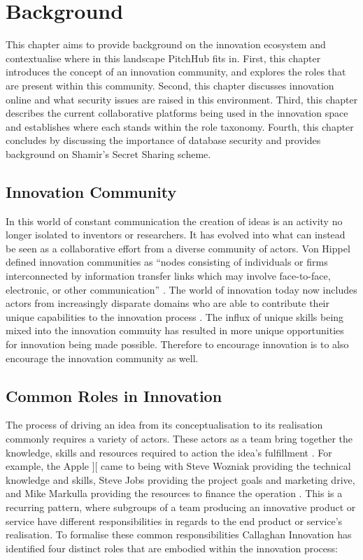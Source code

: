 \chapter{Background}

This chapter aims to provide background on the innovation ecosystem and contextualise where in this landscape PitchHub fits in. First, this chapter introduces the concept of an innovation community, and explores the roles that are present within this community. Second, this chapter discusses innovation online and what security issues are raised in this environment. Third, this chapter describes the current collaborative platforms being used in the innovation space and establishes where each stands within the role taxonomy. Fourth, this chapter concludes by discussing the importance of database security and provides background on Shamir's Secret Sharing scheme.

\section{Innovation Community}
In this world of constant communication the creation of ideas is an activity no longer isolated to inventors or researchers. It has evolved into what can instead be seen as a collaborative effort from a diverse community of actors. Von Hippel defined innovation communities as ``nodes consisting of individuals or firms interconnected by information transfer links which may involve face-to-face, electronic, or other communication'' \cite{von2005democratizing}. The world of innovation today now includes actors from increasingly disparate domains who are able to contribute their unique capabilities to the innovation process \cite{che2003optimal}. The influx of unique skills being mixed into the innovation commuity has resulted in more unique opportunities for innovation being made possible. Therefore to encourage innovation is to also encourage the innovation community as well.

\section{Common Roles in Innovation}\label{commonRolesInInnovation}

The process of driving an idea from its conceptualisation to its realisation commonly requires a variety of actors. These actors as a team bring together the knowledge, skills and resources required to action the idea's fulfillment \cite{engelberger1982robotics}. For example, the Apple ][ came to being with Steve Wozniak providing the technical knowledge and skills, Steve Jobs providing the project goals and marketing drive, and Mike Markulla providing the resources to finance the operation \cite{livingston2007founders}. This is a recurring pattern, where subgroups of a team producing an innovative product or service have different responsibilities in regards to the end product or service's realisation. To formalise these common responsibilities Callaghan Innovation has identified four distinct roles that are embodied within the innovation process:

